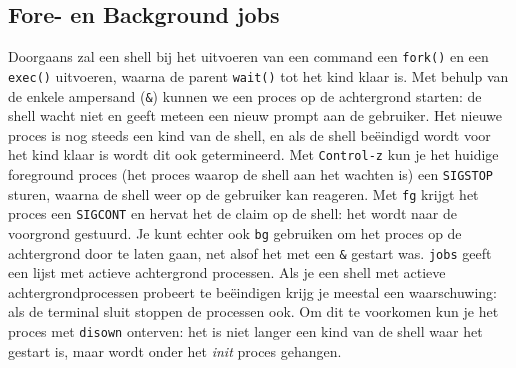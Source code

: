 \subsection{Fore- en Background jobs}\label{fore--en-background-jobs}

Doorgaans zal een shell bij het uitvoeren van een command een \texttt{fork()} en een \texttt{exec()} uitvoeren, waarna de parent \texttt{wait()} tot het kind klaar is. Met behulp van de enkele ampersand (\texttt{\&}) kunnen we een proces op de achtergrond starten: de shell wacht niet en geeft meteen een nieuw prompt aan de gebruiker. Het nieuwe proces is nog steeds een kind van de shell, en als de shell beëindigd wordt voor het kind klaar is wordt dit ook getermineerd. Met \texttt{Control-z} kun je het huidige foreground proces (het proces waarop de shell aan het wachten is) een \texttt{SIGSTOP} sturen, waarna de shell weer op de gebruiker kan reageren. Met \texttt{fg} krijgt het proces een \texttt{SIGCONT} en hervat het de claim op de shell: het wordt naar de voorgrond gestuurd. Je kunt echter ook \texttt{bg} gebruiken om het proces op de achtergrond door te laten gaan, net alsof het met een \texttt{\&} gestart was. \texttt{jobs} geeft een lijst met actieve achtergrond processen. Als je een shell met actieve achtergrondprocessen probeert te beëindigen krijg je meestal een waarschuwing: als de terminal sluit stoppen de processen ook. Om dit te voorkomen kun je het proces met \texttt{disown} onterven: het is niet langer een kind van de shell waar het gestart is, maar wordt onder het \emph{init} proces gehangen.

